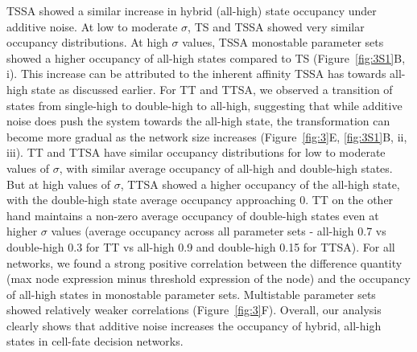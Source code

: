 \documentclass[11pt]{article}
\providecommand{\DIFaddtex}[1]{{\protect\color{red}#1}} %
\providecommand{\DIFdeltex}[1]{} %
\providecommand{\DIFaddbegin}{} %
\providecommand{\DIFaddend}{} %
\providecommand{\DIFdelbegin}{} %
\providecommand{\DIFdelend}{} %
\providecommand{\DIFadd}[1]{\texorpdfstring{\DIFaddtex{#1}}{#1}} %
\providecommand{\DIFdel}[1]{\texorpdfstring{\DIFdeltex{#1}}{}} %
\providecommand{\DIFaddincludegraphics}[2][]{\DIFOincludegraphics[#1]{#2}} %
\providecommand{\DIFdelincludegraphics}[2][]{}
\DeclareRobustCommand{\DIFaddbegin}{\DIFOaddbegin \let\includegraphics\DIFaddincludegraphics} %
\DeclareRobustCommand{\DIFaddend}{\DIFOaddend \let\includegraphics\DIFOincludegraphics} %
\DeclareRobustCommand{\DIFdelbegin}{\DIFOdelbegin \let\includegraphics\DIFdelincludegraphics} %
\DeclareRobustCommand{\DIFdelend}{\DIFOaddend \let\includegraphics\DIFOincludegraphics} %
\begin{document}
TSSA showed a similar increase in hybrid (all-high) state \DIFdelbegin \DIFdel{MRT }\DIFdelend \DIFaddbegin \DIFadd{occupancy }\DIFaddend under additive noise. At low to moderate $\sigma$, TS and TSSA showed very similar \DIFdelbegin \DIFdel{MRT }\DIFdelend \DIFaddbegin \DIFadd{occupancy }\DIFaddend distributions. At high $\sigma$ values, TSSA monostable parameter sets showed a higher \DIFdelbegin \DIFdel{MRT }\DIFdelend \DIFaddbegin \DIFadd{occupancy }\DIFaddend of all-high states compared to TS (Figure~\ref{fig:3S1}B, i). This increase can be attributed to the inherent affinity TSSA has towards all-high state as discussed earlier. For TT and TTSA, we observed a transition of states from single-high to double-high to all-high, suggesting that while additive noise does push the system towards the all-high state, the transformation can become more gradual as the network size increases (Figure~\ref{fig:3}E, \ref{fig:3S1}B, ii, iii). TT and TTSA have similar \DIFdelbegin \DIFdel{MRT }\DIFdelend \DIFaddbegin \DIFadd{occupancy }\DIFaddend distributions for low to moderate values of $\sigma$, with similar average \DIFdelbegin \DIFdel{MRT }\DIFdelend \DIFaddbegin \DIFadd{occupancy }\DIFaddend of all-high and double-high states. But at high values of $\sigma$, TTSA showed a higher \DIFdelbegin \DIFdel{MRT }\DIFdelend \DIFaddbegin \DIFadd{occupancy }\DIFaddend of the all-high state, with the double-high state average \DIFdelbegin \DIFdel{MRT }\DIFdelend \DIFaddbegin \DIFadd{occupancy }\DIFaddend approaching 0. TT on the other hand maintains a non-zero average \DIFdelbegin \DIFdel{MRT }\DIFdelend \DIFaddbegin \DIFadd{occupancy }\DIFaddend of double-high states even at higher $\sigma$ values (average \DIFdelbegin \DIFdel{MRT }\DIFdelend \DIFaddbegin \DIFadd{occupancy }\DIFaddend across all parameter sets - all-high 0.7 vs double-high 0.3 for TT vs all-high 0.9 and double-high 0.15 for TTSA). For all networks, we found a strong positive correlation between the difference quantity (max node expression minus threshold expression of the node) and the \DIFdelbegin \DIFdel{MRT }\DIFdelend \DIFaddbegin \DIFadd{occupancy }\DIFaddend of all-high states in monostable parameter sets. Multistable parameter sets showed relatively weaker correlations (Figure~\ref{fig:3}F). Overall, our analysis clearly shows that additive noise increases the \DIFdelbegin \DIFdel{MRT }\DIFdelend \DIFaddbegin \DIFadd{occupancy }\DIFaddend of hybrid, all-high states in cell-fate decision networks. 
\end{document}
